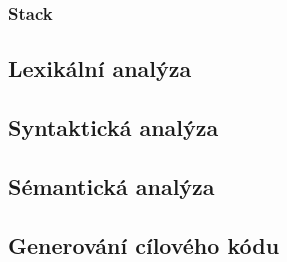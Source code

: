 \documentclass[a4paper, 11pt]{article}
\begin{document}
	\subsubsection{Stack}

	\subsection{Lexikální analýza} \label{sec:lex}
	
	\subsection{Syntaktická analýza}

	\subsection{Sémantická analýza}

	\subsection{Generování cílového kódu}








    
\end{document}
